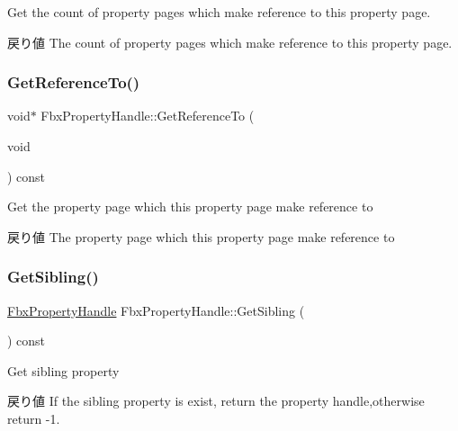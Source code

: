 Get the count of property pages which make reference to this property page. \begin{DoxyReturn}{戻り値}
The count of property pages which make reference to this property page. 
\end{DoxyReturn}
\mbox{\label{class_fbx_property_handle_af9780300940a75d036215b70e67698ac}} 
\subsubsection{\texorpdfstring{Get\+Reference\+To()}{GetReferenceTo()}}
{\footnotesize\ttfamily void$\ast$ Fbx\+Property\+Handle\+::\+Get\+Reference\+To (\begin{DoxyParamCaption}\item[{void}]{ }\end{DoxyParamCaption}) const}

Get the property page which this property page make reference to \begin{DoxyReturn}{戻り値}
The property page which this property page make reference to 
\end{DoxyReturn}
\mbox{\label{class_fbx_property_handle_a216afaae427671182799347b99a1eb12}} 
\subsubsection{\texorpdfstring{Get\+Sibling()}{GetSibling()}}
{\footnotesize\ttfamily \hyperlink{class_fbx_property_handle}{Fbx\+Property\+Handle} Fbx\+Property\+Handle\+::\+Get\+Sibling (\begin{DoxyParamCaption}{ }\end{DoxyParamCaption}) const}

Get sibling property \begin{DoxyReturn}{戻り値}
If the sibling property is exist, return the property handle,otherwise return -\/1. 
\end{DoxyReturn}
\mbox{\label{class_fbx_property_handle_a2cc9715f192ec19f46f4baaef4baf075}} 
